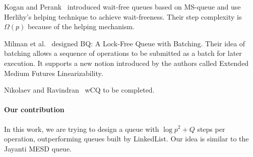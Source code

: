\documentclass{article}
\begin{document}
Kogan and Perank~\cite{DBLP:conf/ppopp/KoganP11} introduced wait-free queues based on MS-queue and use Herlihy's helping technique to achieve wait-freeness. Their step complexity is $\Omega(p)$ because of the helping mechanism.

Milman et al.~\cite{DBLP:conf/spaa/MilmanKLLP18} designed BQ: A Lock-Free Queue with Batching. Their idea of batching allows a sequence of operations to be submitted as a batch for later execution. It supports a new notion introduced by the authors called Extended Medium Futures Linearizability.

Nikolaev and Ravindran~\cite{DBLP:journals/corr/abs-2201-02179} wCQ to be completed.






\paragraph{Our contribution}
In this work, we are trying to design a queue with $\log p^2 +Q$ steps per operation, outperforming queues built by LinkedList. Our idea is similar to the Jayanti MESD queue.

 

\end{document}
